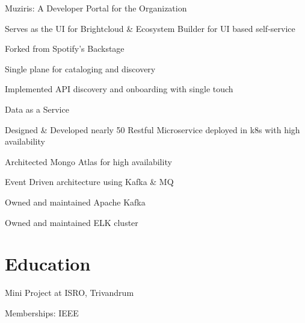 \documentclass[]{de-resume}
\begin{document}
\begin{minipage}[t]{0.66\textwidth}
\begin{tightemize}
\item Muziris: A Developer Portal for the Organization
\begin{tightemize}
	\sectionsep
	\item Serves as the UI for Brightcloud \& Ecosystem Builder for UI based self-service
	\item Forked from Spotify's Backstage
	\item Single plane for cataloging and discovery 
	\item Implemented API discovery and onboarding with single touch
	\sectionsep
\end{tightemize}

\end{tightemize}
\sectionsep
{}
\begin{tightemize}
\item Data as a Service
	\sectionsep
	\begin{tightemize}
	\item Designed \& Developed nearly 50 Restful Microservice deployed in k8s with high availability
	\item Architected Mongo Atlas for high availability 
	\item Event Driven architecture using Kafka \& MQ
	\item Owned and maintained Apache Kafka 
	\item Owned and maintained ELK cluster
	\end{tightemize}
	\sectionsep
\end{tightemize}
\subsectionsep




\section{Education}
\begin{tightemize}
\item Mini Project at ISRO, Trivandrum
\item Memberships: IEEE
\end{tightemize}


\end{minipage} 
\end{document}
